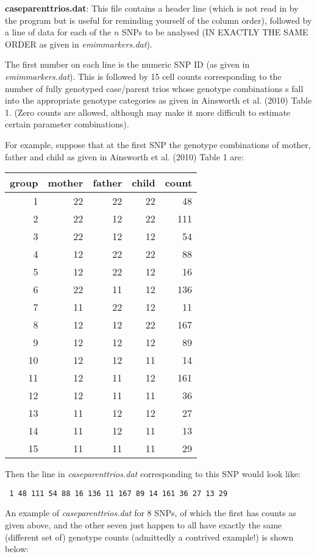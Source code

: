 \documentclass[a4paper,11pt]{report}
\begin{document}
\bigskip

	{\bf  caseparenttrios.dat}: This file contains a header line
(which is not read in by the program but is useful for reminding
yourself of the  column order), followed by a line of data
for each of the $n$ SNPs to be analysed (IN EXACTLY THE SAME ORDER
as given in {\it emimmarkers.dat}).

The first number on each line is the numeric SNP ID (as given in {\it emimmarkers.dat}). This is followed by 15 cell counts corresponding to the number
of fully genotyped case/parent trios whose genotype combinations
s fall into the appropriate genotype categories as given in 
Ainsworth et al. (2010) Table 1. (Zero counts are allowed, although
may make it more difficult to estimate certain parameter combinations).

For example, suppose that at the first SNP the genotype combinations of mother, father and child as given in Ainsworth et al. (2010) Table 1 are:

\begin{tabular}{rrrrr} 
group    &   mother &father &child    &count \\ \hline
1 &22 &22 &22 &48 \\
2 &22 &12 &22       &111 \\
3 &22 &12 &12 &54\\
4 &12 &22 &22 &88\\
5 &12 &22 &12 &16\\
6 &22 &11 &12       &136\\
7 &11 &22 &12 &11\\
8 &12 &12 &22       &167\\
9 &12 &12 &12 &89\\
10 &12 &12 &11 &14\\
11 &12 &11 &12       &161\\
12 &12 &11 &11 &36\\
13 &11 &12 &12 &27\\
14 &11 &12 &11 &13\\
15 &11 &11 &11 &29\\
\end{tabular}

Then the line in	{\it  caseparenttrios.dat} corresponding to this SNP 
would look like:

{\tt
1 	48 111 54 88 16 136 11 167 89 14 161 36 27 13 29
}

An example of {\it  caseparenttrios.dat} for 8 SNPs, of which the first has counts as given above, 
and the other seven just happen to all have exactly the same (different set of) 
genotype counts (admittedly a contrived example!) is shown below:
\newpage
\end{document}
